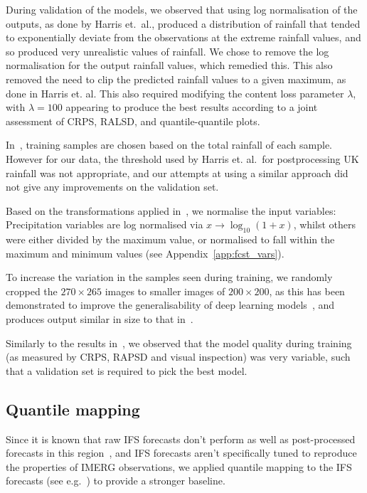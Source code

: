 \documentclass{article}
\begin{document}
During validation of the models, we observed that using log normalisation of the outputs, as done by Harris et.~al., produced a distribution of rainfall that tended to exponentially deviate from the observations at the extreme rainfall values, and so produced very unrealistic values of rainfall. We chose to remove the log normalisation for the output rainfall values, which remedied this. This also removed the need to clip the predicted rainfall values to a given maximum, as done in Harris et. al. This also required modifying the content loss parameter $\lambda$, with $\lambda=100$ appearing to produce the best results according to a joint assessment of CRPS, RALSD, and quantile-quantile plots.


In~\cite{harris_generative_2022}, training samples are chosen based on the total rainfall of each sample. However for our data, the threshold used by Harris et. al.~for postprocessing UK rainfall was not appropriate, and our attempts at using a similar approach did not give any improvements on the validation set.

Based on the transformations applied in~\cite{harris_generative_2022}, we normalise the input variables: Precipitation variables are log normalised via $x \to \log_{10}(1 + x)$, whilst others were either divided by the maximum value, or normalised to fall within the maximum and minimum values (see Appendix~\ref{app:fcst_vars}).

To increase the variation in the samples seen during training, we randomly cropped the $270 \times 265$ images to smaller images of $200 \times 200$, as this has been demonstrated to improve the generalisability of deep learning models~\citep{goodfellow_deep_2016}, and produces output similar in size to that in~\cite{harris_generative_2022}.

Similarly to the results in~\cite{harris_generative_2022}, we observed that the model quality during training (as measured by CRPS, RAPSD and visual inspection) was very variable, such that a validation set is required to pick the best model. 

\subsection{Quantile mapping}
\label{subsec:qm}
Since it is known that raw IFS forecasts don't perform as well as post-processed forecasts in this region~\citep{vogel_skill_2018}, and IFS forecasts aren't specifically tuned to reproduce the properties of IMERG observations, we applied quantile mapping to the IFS forecasts (see e.g.~\cite{maraun_model_2017}) to provide a stronger baseline. 
\end{document}
